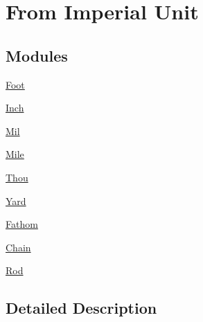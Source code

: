 \hypertarget{group___e_g_x_math-_conversions-_length_conversions-_imperial}{}\section{From Imperial Unit}
\label{group___e_g_x_math-_conversions-_length_conversions-_imperial}
\subsection*{Modules}
\begin{DoxyCompactItemize}
\item 
\mbox{\hyperlink{group___e_g_x_math-_conversions-_length_conversions-_imperial-_foot}{Foot}}
\item 
\mbox{\hyperlink{group___e_g_x_math-_conversions-_length_conversions-_imperial-_inch}{Inch}}
\item 
\mbox{\hyperlink{group___e_g_x_math-_conversions-_length_conversions-_imperial-_mil}{Mil}}
\item 
\mbox{\hyperlink{group___e_g_x_math-_conversions-_length_conversions-_imperial-_mile}{Mile}}
\item 
\mbox{\hyperlink{group___e_g_x_math-_conversions-_length_conversions-_imperial-_thou}{Thou}}
\item 
\mbox{\hyperlink{group___e_g_x_math-_conversions-_length_conversions-_imperial-_yard}{Yard}}
\item 
\mbox{\hyperlink{group___e_g_x_math-_conversions-_length_conversions-_imperial-_fathom}{Fathom}}
\item 
\mbox{\hyperlink{group___e_g_x_math-_conversions-_length_conversions-_imperial-_chain}{Chain}}
\item 
\mbox{\hyperlink{group___e_g_x_math-_conversions-_length_conversions-_imperial-_rod}{Rod}}
\end{DoxyCompactItemize}


\subsection{Detailed Description}
